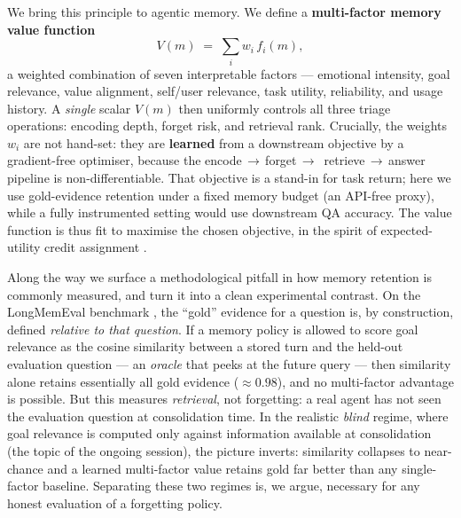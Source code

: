 We bring this principle to agentic memory. We define a
\textbf{multi-factor memory value function}
\begin{equation}
V(m) \;=\; \sum_{i} w_i\, f_i(m),
\label{eq:value-intro}
\end{equation}
a weighted combination of seven interpretable factors --- emotional
intensity, goal relevance, value alignment, self/user relevance, task
utility, reliability, and usage history. A \emph{single} scalar $V(m)$
then uniformly controls all three triage operations: encoding depth,
forget risk, and retrieval rank. Crucially, the weights $w_i$ are not
hand-set: they are \textbf{learned} from a downstream objective by a
gradient-free optimiser, because the
encode\,$\rightarrow$\,\allowbreak forget\,$\rightarrow$\,\allowbreak
retrieve\,$\rightarrow$\,\allowbreak answer
pipeline is non-differentiable. That objective is a stand-in for task
return; here we use gold-evidence retention under a fixed memory budget
(an API-free proxy), while a fully instrumented setting would use
downstream QA accuracy. The value function is thus fit to maximise the
chosen objective, in the spirit of expected-utility credit assignment
\citep{sutton2018rl}.

Along the way we surface a methodological pitfall in how memory
retention is commonly measured, and turn it into a clean experimental
contrast. On the LongMemEval benchmark \citep{wu2025longmemeval}, the
``gold'' evidence for a question is, by construction, defined
\emph{relative to that question}. If a memory policy is allowed to score
goal relevance as the cosine similarity between a stored turn and the
held-out evaluation question --- an \emph{oracle} that peeks at the
future query --- then similarity alone retains essentially all gold
evidence ($\approx\!0.98$), and no multi-factor advantage is possible.
But this measures \emph{retrieval}, not forgetting: a real agent has not
seen the evaluation question at consolidation time. In the realistic
\emph{blind} regime, where goal relevance is computed only against
information available at consolidation (the topic of the ongoing
session), the picture inverts: similarity collapses to near-chance and a
learned multi-factor value retains gold far better than any single-factor
baseline. Separating these two regimes is, we argue, necessary for any
honest evaluation of a forgetting policy.

